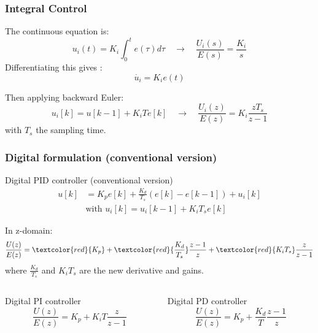 \begin{frame}
	\frametitle{Integral Control}
	The continuous equation is:
	\begin{equation*}
		u_i(t) = K_i \int_0^t e(\tau)d\tau \quad \rightarrow \quad \frac{U_i(s)}{E(s)} = \frac{K_i}{s} 
	\end{equation*}
	Differentiating this gives :
	\begin{equation*}
		\dot{u_i} = K_i e(t)
	\end{equation*}
	
	Then applying backward Euler:
	\begin{equation*}
	u_i[k] = u[k-1] + K_i T e[k] \quad \rightarrow \quad \frac{U_i(z)}{E(z)} = K_i \frac{z T_s}{z - 1}
	\end{equation*}
	with $T_s$ the sampling time.
	
\end{frame}

\begin{frame}
	\frametitle{Digital formulation (conventional version)}
	\vspace{-1em}
	\small{
	\begin{block}{Digital PID controller (conventional version)}
			\vspace{-1em}
			\begin{align*}
			u[k] &= K_p e[k] + \frac{K_d}{T_s}(e[k] - e[k-1])+u_i[k] \\
			&\text{with } u_i[k] = u_i[k-1] + K_i T_s e[k]
			\end{align*}
			
			
			In z-domain:
			\begin{equation*}
			\frac{U(z)}{E(z)} = \textcolor{red}{K_p}  + \textcolor{red}{\frac{K_d}{T_s}}\frac{z-1}{z} + \textcolor{red}{K_i T_s}\frac{z}{z-1}
			\end{equation*}
			where $\frac{K_d}{T_s}$ and $K_iT_s$  are the new derivative and gains.
	\end{block}
	\begin{columns}
		\begin{column}{0.5 \textwidth}
			\begin{block}{Digital PI controller}
				$$\frac{U(z)}{E(z)} = K_p + K_i T \frac{z}{z-1} $$
			\end{block}
		\end{column}
		\begin{column}{0.5 \textwidth}
			\begin{block}{Digital PD controller}
				$$\frac{U(z)}{E(z)} = K_p + \frac{K_d}{T}\frac{z-1}{z} $$
			\end{block}
		\end{column}
	\end{columns}}
	 
\end{frame}

